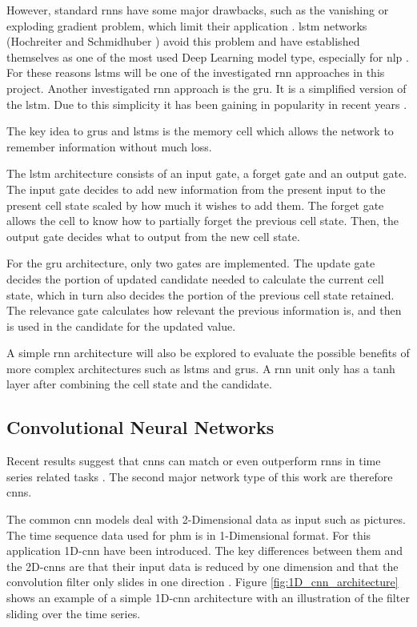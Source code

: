 \documentclass[conference]{IEEEtran}
\begin{document}
However, standard \glspl{rnn} have some major drawbacks, such as the vanishing or exploding gradient problem, which limit their application \cite{Bengio1994}. \gls{lstm} networks (Hochreiter and Schmidhuber \cite{Hochreiter1997}) avoid this problem and have established themselves as one of the most used Deep Learning model type, especially for \gls{nlp} \cite{Wu2016}. For these reasons \glspl{lstm} will be one of the investigated \gls{rnn} approaches in this project. Another investigated \gls{rnn} approach is the \gls{gru}. It is a simplified version of the \gls{lstm}. Due to this simplicity it has been gaining in popularity in recent years \cite{Rana2016}. 

The key idea to \glspl{gru} and \glspl{lstm} is the memory cell which allows the network to remember information without much loss.

The \gls{lstm} architecture consists of an input gate, a forget gate and an output gate. The input gate decides to add new information from the present input to the present cell state scaled by how much it wishes to add them. The forget gate allows the cell to know how to partially forget the previous cell state. Then, the output gate decides what to output from the new cell state.


For the \gls{gru} architecture, only two gates are implemented. The update gate decides the portion of updated candidate needed to calculate the current cell state, which in turn also decides the portion of the previous cell state retained. The relevance gate calculates how relevant the previous information is, and then is used in the candidate for the updated value.

A simple \gls{rnn} architecture will also be explored to evaluate the possible benefits of more complex architectures such as \glspl{lstm} and \glspl{gru}. A \gls{rnn} unit only has a tanh layer after combining the cell state and the candidate.

\subsection{Convolutional Neural Networks}
\label{sec:convolutional_neural_networks}

Recent results suggest that \glspl{cnn} can match or even outperform \glspl{rnn} in time series related tasks \cite{Bai2018}. The second major network type of this work are therefore \glspl{cnn}.

The common \gls{cnn} models deal with 2-Dimensional data as input such as pictures. The time sequence data used for \gls{phm} is in 1-Dimensional format. For this application 1D-\gls{cnn} have been introduced. The key differences between them and the 2D-\glspl{cnn} are that their input data is reduced by one dimension and that the convolution filter only slides in one direction \cite{Akrim2021}. Figure \ref{fig:1D_cnn_architecture} shows an example of a simple 1D-\gls{cnn} architecture with an illustration of the filter sliding over the time series. 
\end{document}
